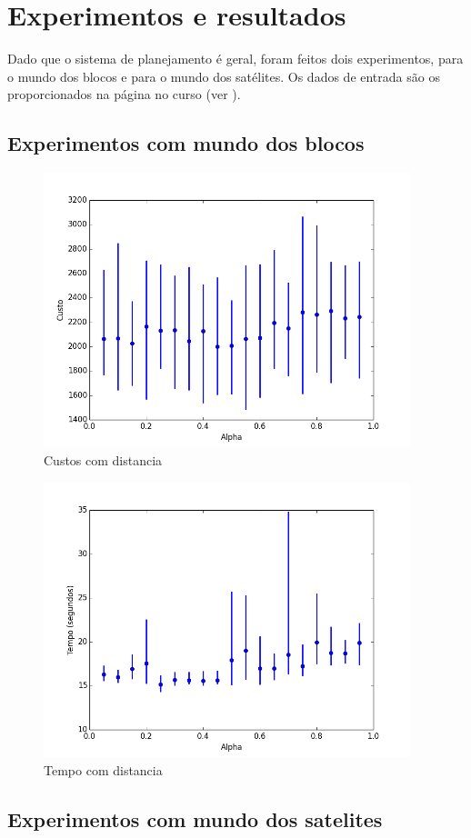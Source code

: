 \section{Experimentos e resultados} 

Dado que o sistema de planejamento é geral, foram feitos dois experimentos, para o mundo dos blocos e para o mundo dos satélites. Os dados de entrada são os proporcionados na página no curso (ver \cite{LabIA15}).

\subsection{Experimentos com mundo dos blocos}
\label{subsec:expblocos}
	
		\begin{figure}[H]
			\centering
			\includegraphics[height=8cm]{images/cost_distance_alpha}
			\caption{Custos com distancia}
			\label{fig:costdistancealpha}
		\end{figure}
		
		\begin{figure}[H]
			\centering
			\includegraphics[height=8cm]{images/time_distance_alpha}
			\caption{Tempo com distancia}
			\label{fig:timedistancealpha}
		\end{figure}

 \subsection{Experimentos com mundo dos satelites}
\label{subsec:expsatelites}